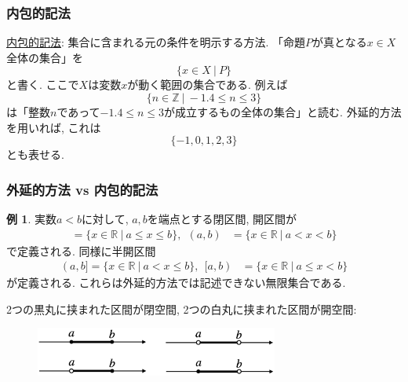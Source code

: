 \documentclass[dvipdfmx,cjk,10.2pt]{beamer}
\newcommand{\R}{\mathbb{R}}
\newcommand{\Z}{\mathbb{Z}}
\theoremstyle{definition}
\newtheorem{Ex}[Thm]{例}
\begin{document}
\begin{frame}
\frametitle{内包的記法}   

 \underline{内包的記法}: 集合に含まれる元の条件を明示する方法. 
「命題$P$が真となる$x \in X$全体の集合」を
$$
\{ x \in X \ | \ P\}
$$
と書く. 
ここで$X$は変数$x$が動く範囲の集合である.  
例えば
$$
\{n \in \Z \ | \ -1.4 \le n \le 3\}
$$
は「整数$n$であって$-1.4 \le n \le 3$が成立するもの全体の集合」と読む. 
外延的方法を用いれば, これは
$$
\{-1,0,1,2,3\}
$$
とも表せる. 

\end{frame}





\begin{frame}
\frametitle{外延的方法 vs 内包的記法}   

\begin{Ex}
実数$a<b$に対して, $a,b$を端点とする閉区間, 開区間が
\begin{align*}
[a,b] = \{x \in \R \ | \ a \le x \le b \}, \ \ (a,b) &=\{x \in \R \ | \ a < x < b \} 
\end{align*}
で定義される. 
同様に半開区間
\begin{align*}
(a,b] = \{x \in \R \ | \ a < x \le b \}, \ \ [a,b) &=\{x \in \R \ | \ a \le x < b \}
\end{align*}
が定義される. 
これらは外延的方法では記述できない無限集合である. 
\end{Ex}

2つの黒丸に挟まれた区間が閉空間, 2つの白丸に挟まれた区間が開空間: 
 \begin{figure}[htbp]
 \begin{center} 
  \includegraphics[width=80mm]{interval.png}
 \end{center}
\end{figure}

\end{frame}




\end{document}
